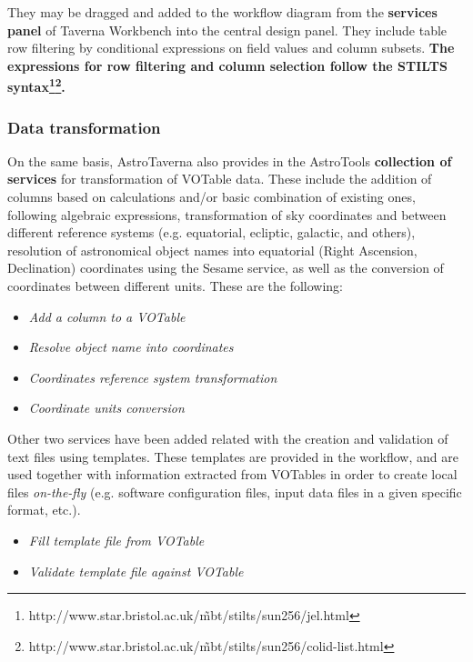 \documentclass{aa}
\begin{document}
They may be dragged and added to the workflow diagram from the \textbf{services panel} of Taverna Workbench into the central design panel. They include table row filtering by conditional expressions on field values and column subsets. \textbf{The expressions for row filtering and column selection follow the STILTS syntax\footnote{http://www.star.bristol.ac.uk/\~mbt/stilts/sun256/jel.html}\fnmsep\footnote{http://www.star.bristol.ac.uk/\~mbt/stilts/sun256/colid-list.html}.}

\subsubsection{Data transformation}
\label{DataTransformation}

On the same basis, AstroTaverna also provides in the AstroTools \textbf{collection of services} for transformation of VOTable data. These include the addition of columns based on calculations and/or basic combination of existing ones, following algebraic expressions, transformation of sky coordinates and between different reference systems (e.g. equatorial, ecliptic, galactic, and others), resolution of astronomical object names into equatorial (Right Ascension, Declination) coordinates using the Sesame service, as well as the conversion of coordinates between different units. These are the following:

\begin{itemize}
\item \textit{Add a column to a VOTable}
\item \textit{Resolve object name into coordinates} 
\item \textit{Coordinates reference system transformation}
\item \textit{Coordinate units conversion}
\end{itemize}

Other two services have been added related with the creation and validation of text files using templates. These templates are provided in the workflow, and are used together with information extracted from VOTables in order to create local files \textit{on-the-fly} (e.g. software configuration files, input data files in a given specific format, etc.).

\begin{itemize}
\item \textit{Fill template file from VOTable}
\item \textit{Validate template file against VOTable}
\end{itemize}
\end{document}
